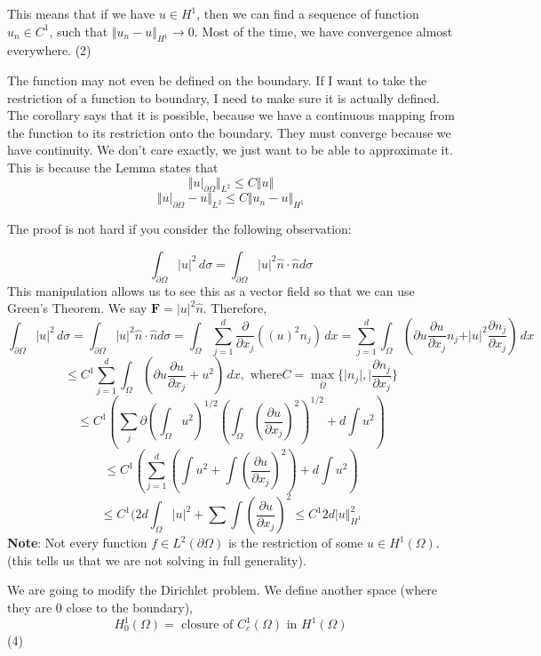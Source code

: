 \documentclass[12pt]{article}
\begin{document}
This means that if we have $u \in H^1$, then we can find a sequence of function $u_n \in C^1$, such that $\Vert u_n - u \Vert_{H^1} \rightarrow 0$. Most of the time, we have convergence almost everywhere. (2)

The function may not even be defined on the boundary. If I want to take the restriction of a function to boundary, I need to make sure it is actually defined. The corollary says that it is possible, because we have a continuous mapping from the function to its restriction onto the boundary. They must converge because we have continuity. We don't care exactly, we just want to be able to approximate it. This is because the Lemma states that 
$$\Vert u\vert_{\partial\Omega} \Vert_{L^2} \leq C \Vert u \Vert$$
$$\Vert u\vert_{\partial\Omega}-u \Vert_{L^2} \leq C \Vert u_n - u \Vert_{H^1}$$

The proof is not hard if you consider the following observation:

$$\int_{\partial\Omega} \vert u \vert^2 \, d\sigma = \int_{\partial\Omega} \vert u\vert^2 \hat{n} \cdot \hat{n} d\sigma $$
This manipulation allows us to see this as a vector field so that we can use Green's Theorem. We say $\textbf{F}=\vert u \vert^2 \hat{n}$. Therefore,
$$\int_{\partial\Omega} \vert u \vert^2 \, d\sigma = \int_{\partial\Omega} \vert u\vert^2 \hat{n} \cdot \hat{n} d\sigma = \int_\Omega \sum^d_{j=1} \frac{\partial}{\partial x_j} ((u)^2 n_j) \, dx = \sum^d_{j=1} \int_{\Omega} ( \partial u \frac{\partial u}{\partial x_j} n_j + \vert u \vert^2 \frac{\partial n_j}{\partial x_j}) \,dx  $$
$$\leq C^1 \sum^d_{j=1} \int_\Omega (\partial u \frac{\partial u}{\partial x_j} + u^2) \, dx, \text{ where} C = \max_{\overline{\Omega}} \{ \vert n_j \vert , \vert \frac{\partial n_j}{\partial x_j}\} $$
$$\leq C^1( \sum_j \partial(\int_{\Omega} u^2)^{1/2}(\int_\Omega (\frac{\partial u}{\partial x_j})^2)^{1/2} + d \int u^2 )$$
$$\leq C^1( \sum^d_{j=1} ( \int u^2 + \int (\frac{\partial u}{\partial x_j})^2) + d \int u^2)$$
$$\leq C^1(2d\int_\Omega \vert u \vert^2 + \sum \int (\frac{\partial u}{\partial x_j})^2 \leq C^1 2 d \vert u \Vert^2_{H^1}$$
\noindent \textbf{Note}: Not every function $f \in L^2(\partial \Omega)$ is the restriction of some $u \in H^1(\Omega)$. (this tells us that we are not solving in full generality).

We are going to modify the Dirichlet problem. We define another space (where they are 0 close to the boundary),
$$H_0^1(\Omega) = \text{ closure of } C_c^1(\Omega) \text{ in } H^1(\Omega)$$
(4)
\end{document}
